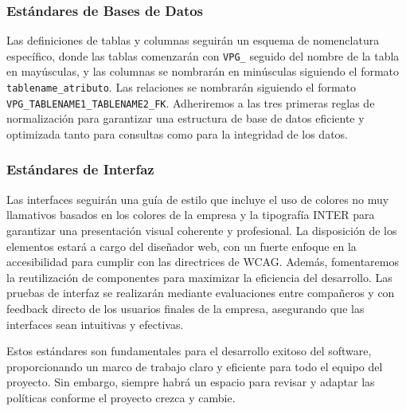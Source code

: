 \subsubsection*{\textbf{Estándares de Bases de Datos}}

Las definiciones de tablas y columnas seguirán un esquema de nomenclatura específico, 
donde las tablas comenzarán con \texttt{VPG\_} seguido del nombre de la tabla en mayúsculas, 
y las columnas se nombrarán en minúsculas siguiendo el formato \texttt{tablename\_atributo}. 
Las relaciones se nombrarán siguiendo el formato \texttt{VPG\_TABLENAME1\_TABLENAME2\_FK}. 
Adheriremos a las tres primeras reglas de normalización para garantizar una estructura de 
base de datos eficiente y optimizada tanto para consultas como para la integridad de los datos.

\subsubsection*{\textbf{Estándares de Interfaz}}

Las interfaces seguirán una guía de estilo que incluye el uso de colores no muy 
llamativos basados en los colores de la empresa y la tipografía INTER para garantizar 
una presentación visual coherente y profesional. La disposición de los elementos estará a 
cargo del diseñador web, con un fuerte enfoque en la accesibilidad para cumplir con las 
directrices de WCAG. Además, fomentaremos la reutilización de componentes para maximizar la 
eficiencia del desarrollo. Las pruebas de interfaz se realizarán mediante evaluaciones 
entre compañeros y con feedback directo de los usuarios finales de la empresa, asegurando 
que las interfaces sean intuitivas y efectivas.

Estos estándares son fundamentales para el desarrollo exitoso del software, proporcionando un 
marco de trabajo claro y eficiente para todo el equipo del proyecto. Sin embargo, siempre habrá 
un espacio para revisar y adaptar las políticas conforme el proyecto crezca y cambie.
